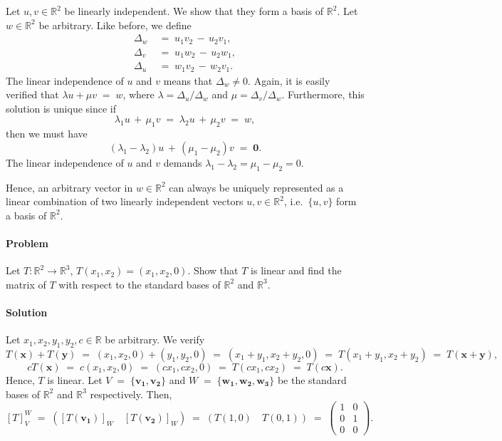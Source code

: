 \documentclass[10pt]{article}
\newcounter{prob}
\def\problem{\stepcounter{prob}\paragraph{Problem \arabic{prob}}}
\def\solution{\paragraph{Solution}}
\let\vec\mathbf
\begin{document}
        Let $u, v \in \mathbb{R}^2$ be linearly independent. We show that they form a basis of $\mathbb{R}^2$. Let $w \in \mathbb{R}^2$ be arbitrary.
        Like before, we define
        \begin{align*}
                \Delta_w \;&=\; u_1v_2 \,-\, u_2v_1, \\
                \Delta_v \;&=\; u_1w_2 \,-\, u_2w_1, \\
                \Delta_u \;&=\; w_1v_2 \,-\, w_2v_1.
        \end{align*}
        The linear independence of $u$ and $v$ means that $\Delta_w \neq 0$. Again, it is easily verified that 
        $\lambda u + \mu v \;=\; w$, where $\lambda = \Delta_u/\Delta_w$ and $\mu = \Delta_v/\Delta_w$.
        Furthermore, this solution is unique since if
        \[
        \lambda_1 u \,+\, \mu_1 v \;=\; \lambda_2 u \,+\, \mu_2 v \;=\;w,
        \]
        then we must have
        \[
        (\lambda_1 - \lambda_2) u \,+\, (\mu_1 - \mu_2) v \;=\; \vec{0}.
        \]
        The linear independence of $u$ and $v$ demands $\lambda_1 - \lambda_2 = \mu_1 - \mu_2 = 0$.

        Hence, an arbitrary vector in $w \in \mathbb{R}^2$ can always be uniquely represented as a linear combination of two linearly
        independent vectors $u, v \in \mathbb{R}^2$, i.e.\ $\{u, v\}$ form a basis of $\mathbb{R}^2$.

        \problem Let $T\colon \mathbb{R}^2 \to \mathbb{R}^3$, $T(x_1, x_2) = (x_1, x_2, 0)$. Show that $T$ is linear and find the matrix of 
        $T$ with respect to the standard bases of $\mathbb{R}^2$ and $\mathbb{R}^3$.
        \solution Let $x_1, x_2, y_1, y_2, c \in \mathbb{R}$ be arbitrary. We verify
        \[
                T(\vec{x}) + T(\vec{y}) \;=\; (x_1, x_2, 0) + (y_1, y_2, 0) \;=\; (x_1 + y_1, x_2 + y_2, 0) \;=\; T(x_1 + y_1, x_2 + y_2) \;=\; T(\vec{x} + \vec{y}),
        \]
        \[
                c T(\vec{x}) \;=\; c (x_1, x_2, 0) \;=\; (cx_1, cx_2, 0) \;=\; T(cx_1, cx_2) \;=\; T(c\vec{x}).
        \]
        Hence, $T$ is linear. Let $V \;=\; \{\vec{v_1}, \vec{v_2}\}$ and $W \;=\; \{\vec{w_1}, \vec{w_2}, \vec{w_3}\}$ be the standard
        bases of $\mathbb{R}^2$ and $\mathbb{R}^3$ respectively. Then,
        \[
        [T]_V^W \;=\; \left([T(\vec{v_1})]_W \quad [T(\vec{v_2})]_W\right) \;=\; (T(1, 0) \quad T(0, 1)) \;=\; 
        \begin{pmatrix}
        1 & 0 \\ 0 & 1 \\ 0 & 0
        \end{pmatrix}.
        \]
        
\end{document}
